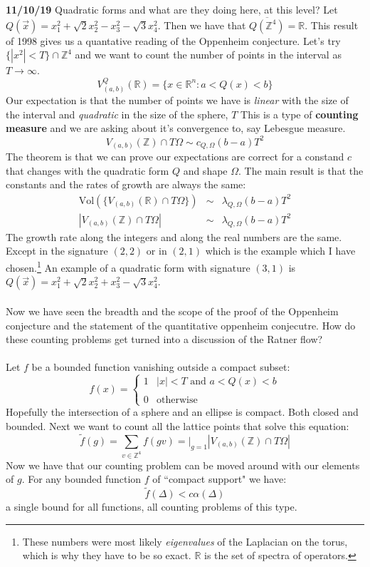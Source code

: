 \documentclass[12pt]{article}
\begin{document}
\noindent \textbf{11/10/19} Quadratic forms and what are they doing here, at this level?   Let $Q(\vec{x}) = x_1^2 + \sqrt{2} x_2^2 - x_3^2 - \sqrt{3}x_4^2$.  Then we have that $\overline{Q(\mathbb{Z}^4)} = \mathbb{R}$.  This result of 1998 gives us a quantative reading of the Oppenheim conjecture.  Let's try $\{  |x^2| < T \} \cap \mathbb{Z}^4$ and we want to count the number of points in the interval as $T \to \infty$.
$$ V^Q_{(a,b)}(\mathbb{R}) = \{ x \in \mathbb{R}^n : a < Q(x) < b \} $$
Our expectation is that the number of points we have is \textit{linear} with the size of the interval and \textit{quadratic} in the size of the sphere, $T$  This is a type of \textbf{counting measure} and we are asking about it's convergence to, say Lebesgue measure.
$$ V_{(a,b)}(\mathbb{Z}) \cap T \Omega \sim c_{Q,\Omega}(b-a)T^2 $$
The theorem is that we can prove our expectations are correct for a constand $c$ that changes with the quadratic form $Q$ and shape $\Omega$.  The main result is that the constants and the rates of growth are always the same:
\begin{eqnarray*}
\text{Vol}(\{ V_{(a,b)}(\mathbb{R}) \cap T \Omega \}) &\sim& \lambda_{Q, \Omega} (b-a)T^2  \\
|V_{(a,b)}(\mathbb{Z}) \cap T\Omega | & \sim & \lambda_{Q, \Omega}(b-a)T^2
\end{eqnarray*}
The growth rate along the integers and along the real numbers are the same.  Except in the signature $(2,2)$ or in $(2,1)$ which is the example which I have chosen.\footnote{These numbers were most likely \textit{eigenvalues} of the Laplacian on the torus, which is why they have to be so exact.  $\mathbb{R}$ is the set of spectra of operators.  } An example of a quadratic form with signature $(3,1)$ is $Q(\vec{x}) = x_1^2 + \sqrt{2} x_2^2 + x_3^2 - \sqrt{3}x_4^2$.  \\ \\
Now we have seen the breadth and the scope of the proof of the Oppenheim conjecture and the statement of the quantitative oppenheim conjecutre.  How do these counting problems get turned into a discussion of the Ratner flow? \\ \\
Let $f$ be a bounded function vanishing outside a compact subset:
$$ f(x) = \left\{  \begin{array}{cl}  1 & |x|<T \text{ and }a < Q(x) < b \\ \\ 0 & \text{otherwise} \end{array} \right. $$
Hopefully the intersection of a sphere and an ellipse is compact.  Both closed and bounded.  Next we want to count all the lattice points that solve this equation:
$$ \tilde{f}(g) = \sum_{v \in \mathbb{Z}^4} f( gv) =\bigg|_{g=1} |V_{(a,b)}(\mathbb{Z}) \cap T\Omega| $$
Now we have that our counting problem can be moved around with our elements of $g$.  For any bounded function $f$ of ``compact support" we have:
$$ \tilde{f}(\Delta) < c \alpha(\Delta) $$
a single bound for all functions, all counting problems of this type.
\end{document}
